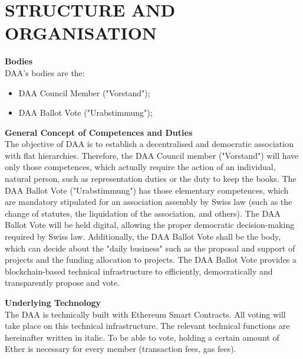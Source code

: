 \section{STRUCTURE AND ORGANISATION}\label{sec:structure-and-organisation}

\item \textbf{Bodies} \\
DAA's bodies are the:
\begin{itemize}
    \item DAA Council Member ("Vorstand");
    \item DAA Ballot Vote ("Urabstimmung");
\end{itemize}

\item \textbf{General Concept of Competences and Duties} \\
The objective of DAA is to establish a decentralised and democratic association with flat hierarchies.
Therefore, the DAA Council member ("Vorstand") will have only those competences, which actually require the action of an individual, natural person, such as representation duties or the duty to keep the books.
The DAA Ballot Vote ("Urabstimmung") has those elementary competences, which are mandatory stipulated for an association assembly by Swiss law (such as the change of statutes, the liquidation of the association, and others).
The DAA Ballot Vote will be held digital, allowing the proper democratic decision-making required by Swiss law.
Additionally, the DAA Ballot Vote shall be the body, which can decide about the "daily business" such as the proposal and support of projects and the funding allocation to projects.
The DAA Ballot Vote provides a blockchain-based technical infrastructure to efficiently, democratically and transparently propose and vote.

\item \textbf{Underlying Technology} \\
The DAA is technically built with Ethereum Smart Contracts.
All voting will take place on this technical infrastructure.
The relevant technical functions are hereinafter written in italic.
To be able to vote, holding a certain amount of Ether is necessary for every member (transaction fees, gas fees).

